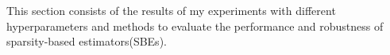 This section consists of the results of my experiments with different hyperparameters and methods to evaluate the performance and robustness of sparsity-based estimators(SBEs).

